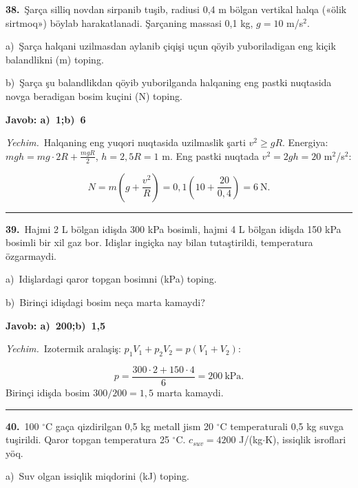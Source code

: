 \documentclass[11pt,a4paper]{article}
\begin{document}
\noindent\textbf{38.}\ Şarça silliq novdan sirpanib tuşib, radiusi 0,4 m bölgan vertikal halqa («ölik sirtmoq») böylab harakatlanadi. Şarçaning massasi 0,1 kg, $g=10$ m/s$^2$.\par
\noindent\hspace*{4mm}a)\ Şarça halqani uzilmasdan aylanib çiqişi uçun qöyib yuboriladigan eng kiçik balandlikni (m) toping.\par
\noindent\hspace*{4mm}b)\ Şarça şu balandlikdan qöyib yuborilganda halqaning eng pastki nuqtasida novga beradigan bosim kuçini (N) toping.\par
\noindent\colorbox{gray!12}{\parbox{\dimexpr\linewidth-2\fboxsep}{\textbf{Javob: a)\ 1;\quad b)\ 6}}}\par\smallskip
\noindent\textit{Yechim.}\ Halqaning eng yuqori nuqtasida uzilmaslik şarti $v^2\ge gR$. Energiya: $mgh=mg\cdot2R+\frac{mgR}{2}$, $h=2{,}5R=1$ m. Eng pastki nuqtada $v^2=2gh=20$ m$^2$/s$^2$:\par
\[N=m\left(g+\frac{v^2}{R}\right)=0{,}1\left(10+\frac{20}{0{,}4}\right)=6\ \text{N}.\]\par\medskip\hrule\medskip
{}\noindent\textbf{39.}\ Hajmi 2 L bölgan idişda 300 kPa bosimli, hajmi 4 L bölgan idişda 150 kPa bosimli bir xil gaz bor. Idişlar ingiçka nay bilan tutaştirildi, temperatura özgarmaydi.\par
\noindent\hspace*{4mm}a)\ Idişlardagi qaror topgan bosimni (kPa) toping.\par
\noindent\hspace*{4mm}b)\ Birinçi idişdagi bosim neça marta kamaydi?\par
\noindent\colorbox{gray!12}{\parbox{\dimexpr\linewidth-2\fboxsep}{\textbf{Javob: a)\ 200;\quad b)\ 1,5}}}\par\smallskip
\noindent\textit{Yechim.}\ Izotermik aralaşiş: $p_1V_1+p_2V_2=p(V_1+V_2)$:\par
\[p=\frac{300\cdot2+150\cdot4}{6}=200\ \text{kPa}.\]
Birinçi idişda bosim $300/200=1{,}5$ marta kamaydi.\par\par\medskip\hrule\medskip
{}\noindent\textbf{40.}\ 100 $^\circ$C gaça qizdirilgan 0,5 kg metall jism 20 $^\circ$C temperaturali 0,5 kg suvga tuşirildi. Qaror topgan temperatura 25 $^\circ$C. $c_{suv}=4200$ J/(kg$\cdot$K), issiqlik isroflari yöq.\par
\noindent\hspace*{4mm}a)\ Suv olgan issiqlik miqdorini (kJ) toping.\par
\end{document}
